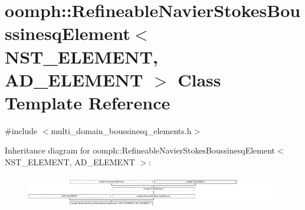\hypertarget{classoomph_1_1RefineableNavierStokesBoussinesqElement}{}\section{oomph\+:\+:Refineable\+Navier\+Stokes\+Boussinesq\+Element$<$ N\+S\+T\+\_\+\+E\+L\+E\+M\+E\+NT, A\+D\+\_\+\+E\+L\+E\+M\+E\+NT $>$ Class Template Reference}
\label{classoomph_1_1RefineableNavierStokesBoussinesqElement}


{\ttfamily \#include $<$multi\+\_\+domain\+\_\+boussinesq\+\_\+elements.\+h$>$}

Inheritance diagram for oomph\+:\+:Refineable\+Navier\+Stokes\+Boussinesq\+Element$<$ N\+S\+T\+\_\+\+E\+L\+E\+M\+E\+NT, A\+D\+\_\+\+E\+L\+E\+M\+E\+NT $>$\+:\begin{figure}[H]
\begin{center}
\leavevmode
\includegraphics[height=1.464052cm]{classoomph_1_1RefineableNavierStokesBoussinesqElement}
\end{center}
\end{figure}

